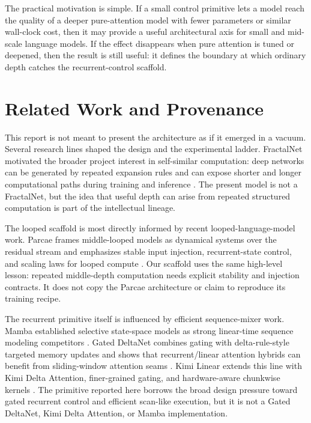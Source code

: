 \documentclass[11pt]{article}
\newcommand{\parcae}{Parcae}
\begin{document}
The practical motivation is simple. If a small control primitive lets a model
reach the quality of a deeper pure-attention model with fewer parameters or
similar wall-clock cost, then it may provide a useful architectural axis for
small and mid-scale language models. If the effect disappears when pure
attention is tuned or deepened, then the result is still useful: it defines the
boundary at which ordinary depth catches the recurrent-control scaffold.

\section{Related Work and Provenance}

This report is not meant to present the architecture as if it emerged in a
vacuum. Several research lines shaped the design and the experimental ladder.
FractalNet motivated the broader project interest in self-similar computation:
deep networks can be generated by repeated expansion rules and can expose
shorter and longer computational paths during training and inference
\cite{larsson2017fractalnet}. The present model is not a FractalNet, but the
idea that useful depth can arise from repeated structured computation is part
of the intellectual lineage.

The looped scaffold is most directly informed by recent looped-language-model
work. \parcae{} frames middle-looped models as dynamical systems over the
residual stream and emphasizes stable input injection, recurrent-state control,
and scaling laws for looped compute \cite{prairie2026parcae}. Our scaffold uses
the same high-level lesson: repeated middle-depth computation needs explicit
stability and injection contracts. It does not copy the \parcae{} architecture
or claim to reproduce its training recipe.

The recurrent primitive itself is influenced by efficient sequence-mixer work.
Mamba established selective state-space models as strong linear-time sequence
modeling competitors \cite{gu2023mamba}. Gated DeltaNet combines gating with
delta-rule-style targeted memory updates and shows that recurrent/linear
attention hybrids can benefit from sliding-window attention seams
\cite{yang2025gateddelta}. Kimi Linear extends this line with Kimi Delta
Attention, finer-grained gating, and hardware-aware chunkwise kernels
\cite{kimiteam2025kimi}. The primitive reported here borrows the broad design
pressure toward gated recurrent control and efficient scan-like execution, but
it is not a Gated DeltaNet, Kimi Delta Attention, or Mamba implementation.
\end{document}
